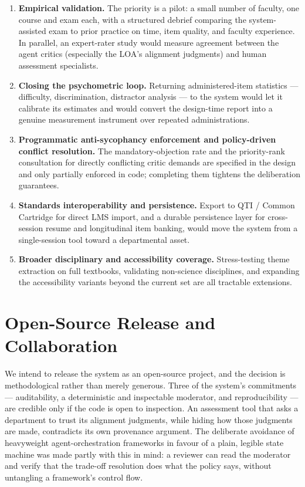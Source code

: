 \documentclass[
  11pt,
  letterpaper,
]{article}
\providecommand{\tightlist}{%
  \setlength{\itemsep}{0pt}\setlength{\parskip}{0pt}}
\begin{document}
\begin{enumerate}
\def\labelenumi{\arabic{enumi}.}
\tightlist
\item
  \textbf{Empirical validation.} The priority is a pilot: a small number
  of faculty, one course and exam each, with a structured debrief
  comparing the system-assisted exam to prior practice on time, item
  quality, and faculty experience. In parallel, an expert-rater study
  would measure agreement between the agent critics (especially the
  LOA's alignment judgments) and human assessment specialists.
\item
  \textbf{Closing the psychometric loop.} Returning administered-item
  statistics --- difficulty, discrimination, distractor analysis --- to
  the system would let it calibrate its estimates and would convert the
  design-time report into a genuine measurement instrument over repeated
  administrations.
\item
  \textbf{Programmatic anti-sycophancy enforcement and policy-driven
  conflict resolution.} The mandatory-objection rate and the
  priority-rank consultation for directly conflicting critic demands are
  specified in the design and only partially enforced in code;
  completing them tightens the deliberation guarantees.
\item
  \textbf{Standards interoperability and persistence.} Export to QTI /
  Common Cartridge for direct LMS import, and a durable persistence
  layer for cross-session resume and longitudinal item banking, would
  move the system from a single-session tool toward a departmental
  asset.
\item
  \textbf{Broader disciplinary and accessibility coverage.}
  Stress-testing theme extraction on full textbooks, validating
  non-science disciplines, and expanding the accessibility variants
  beyond the current set are all tractable extensions.
\end{enumerate}

\section{Open-Source Release and
Collaboration}\label{open-source-release-and-collaboration}

We intend to release the system as an open-source project, and the
decision is methodological rather than merely generous. Three of the
system's commitments --- auditability, a deterministic and inspectable
moderator, and reproducibility --- are credible only if the code is open
to inspection. An assessment tool that asks a department to trust its
alignment judgments, while hiding how those judgments are made,
contradicts its own provenance argument. The deliberate avoidance of
heavyweight agent-orchestration frameworks in favour of a plain, legible
state machine was made partly with this in mind: a reviewer can read the
moderator and verify that the trade-off resolution does what the policy
says, without untangling a framework's control flow.
\end{document}
